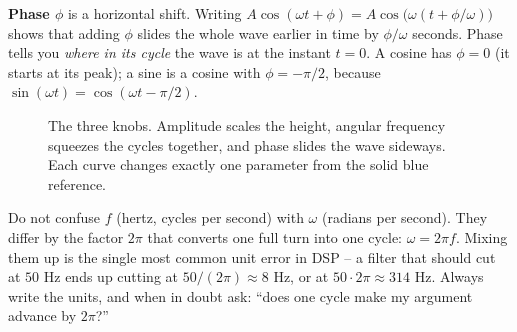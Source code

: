 \textbf{Phase $\phi$} is a horizontal shift. Writing $A\cos(\omega t + \phi) =
A\cos\!\big(\omega(t + \phi/\omega)\big)$ shows that adding $\phi$ slides the whole wave earlier
in time by $\phi/\omega$ seconds. Phase tells you \emph{where in its cycle} the wave is at the
instant $t = 0$. A cosine has $\phi = 0$ (it starts at its peak); a sine is a cosine with
$\phi = -\pi/2$, because $\sin(\omega t) = \cos(\omega t - \pi/2)$.

\begin{figure}[H]
\centering
{}
\caption{The three knobs. Amplitude scales the height, angular frequency squeezes the cycles
together, and phase slides the wave sideways. Each curve changes exactly one parameter from the
solid blue reference.}
\label{ch04:fig-three-knobs}
\end{figure}

\begin{trapbox}
Do not confuse $f$ (hertz, cycles per second) with $\omega$ (radians per second). They differ by
the factor $2\pi$ that converts one full turn into one cycle: $\omega = 2\pi f$. Mixing them up is
the single most common unit error in DSP -- a filter that should cut at $50$ Hz ends up cutting at
$50/(2\pi) \approx 8$ Hz, or at $50\cdot 2\pi \approx 314$ Hz. Always write the units, and when in
doubt ask: ``does one cycle make my argument advance by $2\pi$?''
\end{trapbox}

